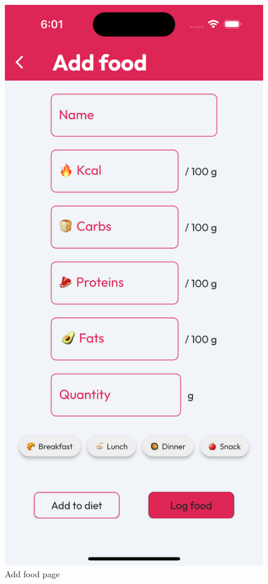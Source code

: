 \documentclass{Configuration_Files/PoliMi3i_thesis}
\begin{document}
\begin{figure}[!h]
  \includegraphics[scale=0.1]{Images/Screenshots/Mobile/AddFoodLight.png}
  \caption{Add food page}
\end{figure}

\clearpage
\end{document}
